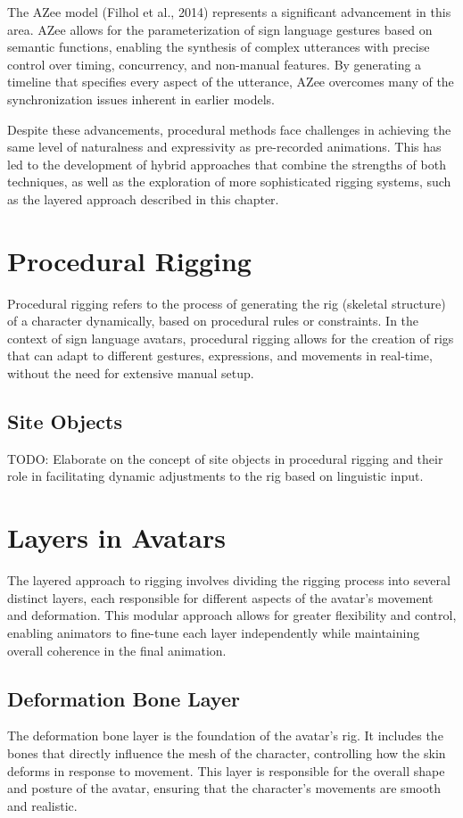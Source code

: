 \documentclass[../../main.tex]{subfiles}
\begin{document}
The AZee model (Filhol et al., 2014) represents a significant advancement in this area. AZee allows for the parameterization of sign language gestures based on semantic functions, enabling the synthesis of complex utterances with precise control over timing, concurrency, and non-manual features. By generating a timeline that specifies every aspect of the utterance, AZee overcomes many of the synchronization issues inherent in earlier models.

Despite these advancements, procedural methods face challenges in achieving the same level of naturalness and expressivity as pre-recorded animations. This has led to the development of hybrid approaches that combine the strengths of both techniques, as well as the exploration of more sophisticated rigging systems, such as the layered approach described in this chapter.

\section{Procedural Rigging}
Procedural rigging refers to the process of generating the rig (skeletal structure) of a character dynamically, based on procedural rules or constraints. In the context of sign language avatars, procedural rigging allows for the creation of rigs that can adapt to different gestures, expressions, and movements in real-time, without the need for extensive manual setup.

\subsection{Site Objects}
TODO: Elaborate on the concept of site objects in procedural rigging and their role in facilitating dynamic adjustments to the rig based on linguistic input.

\section{Layers in Avatars}
The layered approach to rigging involves dividing the rigging process into several distinct layers, each responsible for different aspects of the avatar's movement and deformation. This modular approach allows for greater flexibility and control, enabling animators to fine-tune each layer independently while maintaining overall coherence in the final animation.

\subsection{Deformation Bone Layer}
The deformation bone layer is the foundation of the avatar's rig. It includes the bones that directly influence the mesh of the character, controlling how the skin deforms in response to movement. This layer is responsible for the overall shape and posture of the avatar, ensuring that the character's movements are smooth and realistic.
\end{document}
